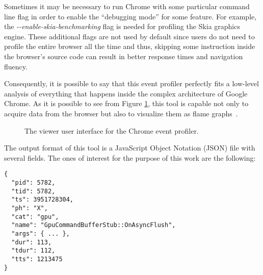 Sometimes it may be necessary
to run Chrome with some particular command line flag in order to enable the
``debugging mode'' for some feature. For example, the \emph{-{}-enable-skia-benchmarking}
flag is needed for profiling the Skia graphics engine. These additional flags
are not used by default since users do not need to profile the entire browser
all the time and thus, skipping some instruction inside the browser's source code
can result in better response times and navigation fluency.

Consequently, it is possible
to say that this event profiler perfectly fits a low-level analysis of everything
that happens inside the complex architecture of Google Chrome.
As it is possible to see from Figure \ref{img:chrome_event_profiler}, this tool
is capable not only to acquire data from the browser but also to visualize them
as flame graphs~\cite{gregg2016flame}.
\begin{figure}[!htb]
    \caption{The viewer user interface for the Chrome event profiler.}
    \label{img:chrome_event_profiler}
\end{figure}

The output format of this tool is a JavaScript Object Notation (JSON) file with
several fields. The ones of interest for the purpose of this work are the following:
\begin{lstlisting}
{
  "pid": 5782,
  "tid": 5782,
  "ts": 3951728304,
  "ph": "X",
  "cat": "gpu",
  "name": "GpuCommandBufferStub::OnAsyncFlush",
  "args": { ... },
  "dur": 113,
  "tdur": 112,
  "tts": 1213475
}
\end{lstlisting}

